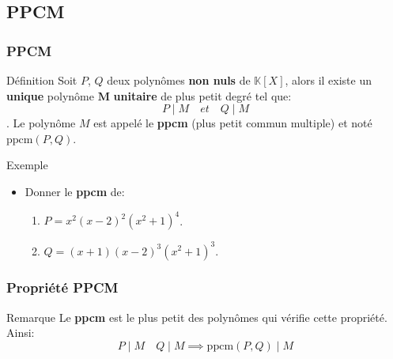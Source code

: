 \documentclass{beamer}
\newcommand{\setK}{\mathbb{K}}
\begin{document}
\subsection{PPCM}
\begin{frame}[t]
  \frametitle{PPCM}
 \begin{block}{Définition}
   \small
   Soit $P$, $Q$ deux polynômes  \textbf{non nuls} de $\setK[X]$, alors il
   existe un \textbf{unique}  polynôme $\mathbf{M}$ \alert{\textbf{unitaire}} de plus petit degré tel que:
   $$ P\;|\; M \quad et\quad Q\;|\; M$$.
     Le polynôme $M$ est appelé le \textbf{\alert{ppcm}} (plus petit
       commun multiple) et noté $\text{ppcm}(P, Q)$.
 \end{block} 
 \pause

 \begin{block}{Exemple}
   \begin{itemize}
     \item Donner le \textbf{ppcm} de:
  \begin{enumerate}
    \item  $P = x^2(x-2)^2(x^2+1)^4$.\\[4pt]
    \item  $Q=(x+1)(x-2)^3(x^2+1)^3$.
  \end{enumerate}
   \end{itemize} 
 \end{block}
\end{frame}
\begin{frame}
  \frametitle{Propriété PPCM}
 \begin{block}{Remarque}
  Le \textbf{ppcm} est le plus petit des polynômes qui vérifie cette propriété.
  Ainsi:
  \begin{equation}
    P\;|\; M\quad Q\;|\; M\implies \text{ppcm}(P, Q)\;|\;M 
  \end{equation}
 \end{block}
\end{frame}
\end{document}
